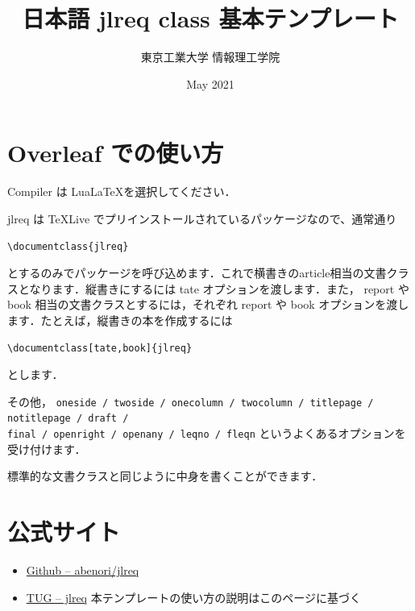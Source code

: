 \documentclass{jlreq}
\title{日本語 jlreq class  基本テンプレート}
\author{東京工業大学 情報理工学院}
\date{May 2021}
\begin{document}
\maketitle

\section{Overleaf での使い方}
Compiler は Lua\LaTeX を選択してください．

jlreq は \TeX Live でプリインストールされているパッケージなので、通常通り

\verb+\documentclass{jlreq}+

とするのみでパッケージを呼び込めます．これで横書きのarticle相当の文書クラスとなります．縦書きにするには tate オプションを渡します．また， report や book 相当の文書クラスとするには，それぞれ report や book オプションを渡します．たとえば，縦書きの本を作成するには

\verb+\documentclass[tate,book]{jlreq}+

とします．

その他， \verb+oneside / twoside / onecolumn / twocolumn / titlepage / notitlepage / draft /+ \\ \verb+final / openright / openany / leqno / fleqn+ というよくあるオプションを受け付けます．

標準的な文書クラスと同じように中身を書くことができます．

\section{公式サイト}
\begin{itemize}
    \item \href{https://github.com/abenori/jlreq}{Github -- abenori/jlreq}
    \item \href{https://www.tug.org/texlive//Contents/live/texmf-dist/doc/latex/jlreq/jlreq-ja.html}{TUG -- jlreq} 本テンプレートの使い方の説明はこのページに基づく
\end{itemize}
\end{document}
